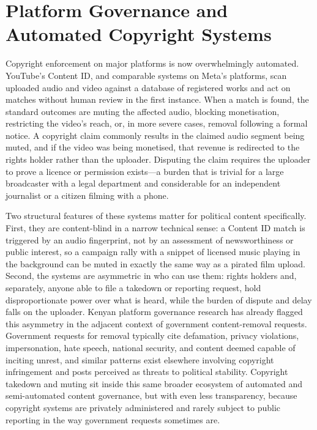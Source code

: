 \documentclass{article}
\begin{document}
\section{Platform Governance and Automated Copyright Systems}

Copyright enforcement on major platforms is now overwhelmingly automated. YouTube's Content ID, and comparable systems on Meta's platforms, scan uploaded audio and video against a database of registered works and act on matches without human review in the first instance. When a match is found, the standard outcomes are muting the affected audio, blocking monetisation, restricting the video's reach, or, in more severe cases, removal following a formal notice. A copyright claim commonly results in the claimed audio segment being muted, and if the video was being monetised, that revenue is redirected to the rights holder rather than the uploader.\cite{thematic2026} Disputing the claim requires the uploader to prove a licence or permission exists—a burden that is trivial for a large broadcaster with a legal department and considerable for an independent journalist or a citizen filming with a phone.

Two structural features of these systems matter for political content specifically. First, they are content-blind in a narrow technical sense: a Content ID match is triggered by an audio fingerprint, not by an assessment of newsworthiness or public interest, so a campaign rally with a snippet of licensed music playing in the background can be muted in exactly the same way as a pirated film upload. Second, the systems are asymmetric in who can use them: rights holders and, separately, anyone able to file a takedown or reporting request, hold disproportionate power over what is heard, while the burden of dispute and delay falls on the uploader. Kenyan platform governance research has already flagged this asymmetry in the adjacent context of government content-removal requests. Government requests for removal typically cite defamation, privacy violations, impersonation, hate speech, national security, and content deemed capable of inciting unrest, and similar patterns exist elsewhere involving copyright infringement and posts perceived as threats to political stability.\cite{bma2026} Copyright takedown and muting sit inside this same broader ecosystem of automated and semi-automated content governance, but with even less transparency, because copyright systems are privately administered and rarely subject to public reporting in the way government requests sometimes are.
\end{document}
